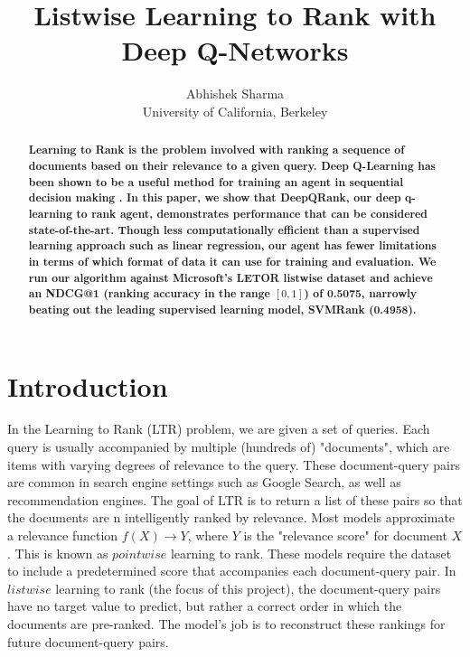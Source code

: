 \documentclass{article}
\title{Listwise Learning to Rank with Deep Q-Networks}
\author{
  Abhishek Sharma\\
  University of California, Berkeley
}
\begin{document}
\maketitle

\begin{abstract}
\textbf{Learning to Rank is the problem involved with ranking a sequence of documents based on their relevance to a given query. Deep Q-Learning has been shown to be a useful method for training an agent in sequential decision making \cite{dqn_paper}. In this paper, we show that DeepQRank, our deep q-learning to rank agent, demonstrates performance that can be considered state-of-the-art. Though less computationally efficient than a supervised learning approach such as linear regression, our agent has fewer limitations in terms of which format of data it can use for training and evaluation. We run our algorithm against Microsoft's LETOR listwise dataset \cite{letor} and achieve an NDCG@1 (ranking accuracy in the range $[0,1]$) of 0.5075, narrowly beating out the leading supervised learning model, SVMRank (0.4958). 
}

%
\end{abstract}
\section{Introduction}
In the Learning to Rank (LTR) problem, we are given a set of queries. Each query is usually accompanied by multiple (hundreds of) "documents", which are items with varying degrees of relevance to the query. These document-query pairs are common in search engine settings such as Google Search, as well as recommendation engines. The goal of LTR is to return a list of these pairs so that the documents are n intelligently ranked by relevance. Most models approximate a relevance function $f(X) \rightarrow Y$, where $Y$ is the "relevance score" for document $X$. This is known as $pointwise$ learning to rank. These models require the dataset to include a predetermined score that accompanies each document-query pair. In $listwise$ learning to rank (the focus of this project), the document-query pairs have no target value to predict, but rather a correct order in which the documents are pre-ranked. The model's job is to reconstruct these rankings for future document-query pairs.
\end{document}
